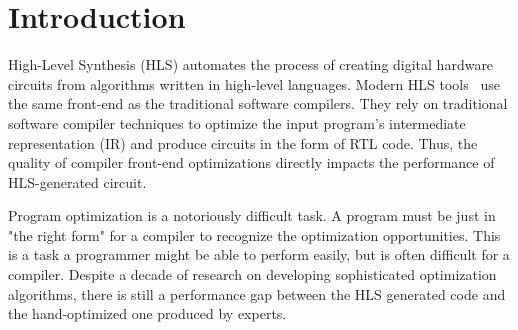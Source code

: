 \section{Introduction}
High-Level Synthesis (HLS) automates the process of creating digital hardware circuits from algorithms written in high-level languages.  
Modern HLS tools~\cite{xilinx_vivado_hls,intel_hls,canis2013legup} use the same front-end as the traditional software compilers.  
They rely on traditional software compiler techniques to optimize the input program's intermediate representation (IR) and produce circuits in the form of RTL code. %
Thus, the quality of compiler front-end optimizations directly impacts the performance of HLS-generated circuit. 

Program optimization is a notoriously difficult task. 
A program must be just in "the right form" for a compiler to recognize the optimization opportunities. This is a task a programmer might be able to perform easily, but is often difficult for a compiler.
Despite a decade of research on developing sophisticated optimization algorithms, 
there is still a performance gap between the HLS generated code and the hand-optimized one produced by experts. %


